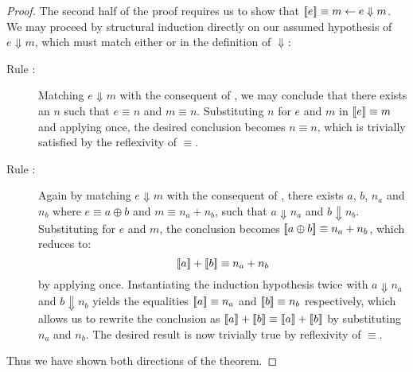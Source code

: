 \begin{proof}
\noindent The second half of the proof requires us to show that $\sb[e]
\equiv m \leftarrow e \Downarrow m$. We may proceed by structural induction
directly on our assumed hypothesis of $e \Downarrow m$, which must match
either  or  in the definition of
$\Downarrow$:
\begin{description}
\item[Rule :]%
Matching $e \Downarrow m$ with the consequent of , we may
conclude that there exists an $n$ such that $e \equiv n$ and $m \equiv n$.
Substituting $n$ for $e$ and $m$ in $\sb[e] \equiv m$ and applying
 once, the desired conclusion becomes $n \equiv n$, which
is trivially satisfied by the reflexivity of $\equiv$.
\item[Rule :]%
Again by matching $e \Downarrow m$ with the consequent of ,
there exists $a$, $b$, $n_a$ and $n_b$ where $e \equiv a \oplus b$ and $m
\equiv n_a + n_b$, such that $a \Downarrow n_a$ and $b \Downarrow n_b$.
Substituting for $e$ and $m$, the conclusion becomes $\sb[a \oplus b] \equiv
n_a + n_b$, which reduces to:
\[
	\sb[a] + \sb[b] \equiv n_a + n_b
\]
by applying  once. Instantiating the induction
hypothesis twice with $a \Downarrow n_a$ and $b \Downarrow n_b$ yields the
equalities $\sb[a] \equiv n_a$ and $\sb[b] \equiv n_b$ respectively, which
allows us to rewrite the conclusion as $\sb[a] + \sb[b] \equiv \sb[a]
+ \sb[b]$ by substituting $n_a$ and $n_b$. The desired result is now
trivially true by reflexivity of $\equiv$.
\end{description}

\noindent Thus we have shown both directions of the theorem.
\end{proof}





